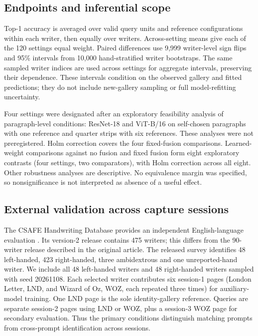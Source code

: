 \subsection{Endpoints and inferential scope}
\label{sec:statistics}
Top-1 accuracy is averaged over valid query units and reference configurations within each writer, then equally over writers. Across-setting means give each of the 120 settings equal weight. Paired differences use 9,999 writer-level sign flips and 95\% intervals from 10,000 hand-stratified writer bootstraps. The same sampled writer indices are used across settings for aggregate intervals, preserving their dependence. These intervals condition on the observed gallery and fitted predictions; they do not include new-gallery sampling or full model-refitting uncertainty.

Four settings were designated after an exploratory feasibility analysis of paragraph-level conditions: ResNet-18 and ViT-B/16 on self-chosen paragraphs with one reference and quarter strips with six references. These analyses were not preregistered. Holm correction covers the four fixed-fusion comparisons. Learned-weight comparisons against no fusion and fixed fusion form eight exploratory contrasts (four settings, two comparators), with Holm correction across all eight. Other robustness analyses are descriptive. No equivalence margin was specified, so nonsignificance is not interpreted as absence of a useful effect.


\subsection{External validation across capture sessions}
\label{sec:csafemethods}
The CSAFE Handwriting Database provides an independent English-language evaluation \cite{crawford2020database,crawford2026csafe}. Its version-2 release contains 475 writers; this differs from the 90-writer release described in the original article. The released survey identifies 48 left-handed, 423 right-handed, three ambidextrous and one unreported-hand writer. We include all 48 left-handed writers and 48 right-handed writers sampled with seed 20261108. Each selected writer contributes six session-1 pages (London Letter, LND, and Wizard of Oz, WOZ, each repeated three times) for auxiliary-model training. One LND page is the sole identity-gallery reference. Queries are separate session-2 pages using LND or WOZ, plus a session-3 WOZ page for secondary evaluation. Thus the primary conditions distinguish matching prompts from cross-prompt identification across sessions.

